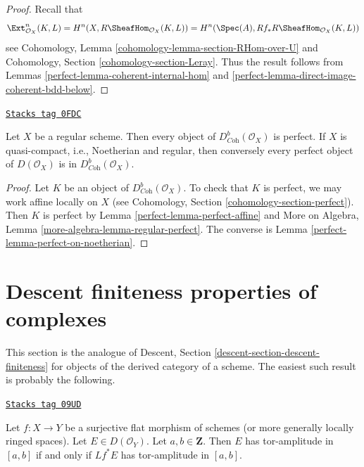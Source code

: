 \begin{proof}

Recall that
$$
\Ext_{\mathcal{O}_X}^n(K, L) =
H^n(X, R\SheafHom_{\mathcal{O}_X}(K, L)) =
H^n(\Spec(A), Rf_*R\SheafHom_{\mathcal{O}_X}(K, L))
$$
see Cohomology, Lemma \ref{cohomology-lemma-section-RHom-over-U}
and Cohomology, Section \ref{cohomology-section-Leray}.
Thus the result follows from
Lemmas \ref{perfect-lemma-coherent-internal-hom} and
\ref{perfect-lemma-direct-image-coherent-bdd-below}.
\end{proof}

\begin{lemma}
\label{perfect-lemma-perfect-on-regular}
\href{https://stacks.math.columbia.edu/tag/0FDC}{\texttt{Stacks tag 0FDC}}

Let $X$ be a regular scheme. Then
every object of $D^b_{\textit{Coh}}(\mathcal{O}_X)$ is perfect.
If $X$ is quasi-compact, i.e., Noetherian and regular,
then conversely every perfect object of
$D(\mathcal{O}_X)$ is in $D^b_{\textit{Coh}}(\mathcal{O}_X)$.
\end{lemma}

\begin{proof}

Let $K$ be an object of $D^b_{\textit{Coh}}(\mathcal{O}_X)$.
To check that $K$ is perfect, we may work affine locally on $X$
(see Cohomology, Section \ref{cohomology-section-perfect}).
Then $K$ is perfect by Lemma \ref{perfect-lemma-perfect-affine} and
More on Algebra, Lemma \ref{more-algebra-lemma-regular-perfect}.
The converse is Lemma \ref{perfect-lemma-perfect-on-noetherian}.
\end{proof}

\section{Descent finiteness properties of complexes}
\label{perfect-section-descent-finiteness}
This section is the analogue of
Descent, Section \ref{descent-section-descent-finiteness}
for objects of the derived category of a scheme.
The easiest such result is probably the following.

\begin{lemma}
\label{perfect-lemma-tor-amplitude-descends}
\href{https://stacks.math.columbia.edu/tag/09UD}{\texttt{Stacks tag 09UD}}

Let $f : X \to Y$ be a surjective flat morphism of schemes
(or more generally locally ringed spaces).
Let $E \in D(\mathcal{O}_Y)$. Let $a, b \in \mathbf{Z}$.
Then $E$ has tor-amplitude in $[a, b]$ if and only if
$Lf^*E$ has tor-amplitude in $[a, b]$.
\end{lemma}

